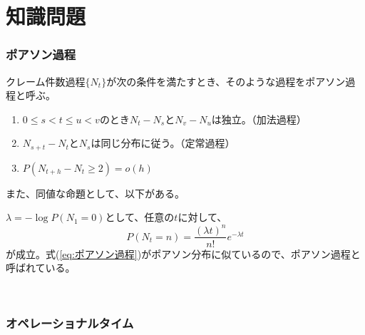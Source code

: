 \section{知識問題}

\subsubsection{ポアソン過程}

\begin{sol}

クレーム件数過程$\{N_t\}$が次の条件を満たすとき、そのような過程をポアソン過程と呼ぶ。

\begin{enumerate}
  \item $0 \leq s < t \leq u < v$のとき$N_t - N_s$と$N_v - N_u$は独立。（加法過程）
  \item $N_{s+t} - N_t$と$N_s$は同じ分布に従う。（定常過程）
  \item $P(N_{t+h} - N_t \geq 2) = o(h) $
\end{enumerate}

また、同値な命題として、以下がある。

$\lambda = - \log P(N_1 = 0)$として、任意の$t$に対して、
\begin{equation}
  P(N_t = n) = \frac{(\lambda t)^n}{n!} e^{-\lambda t}
  \label{eq:ポアソン過程}
\end{equation}
が成立。式(\ref{eq:ポアソン過程})がポアソン分布に似ているので、ポアソン過程と呼ばれている。

\end{sol}

\

\newpage

\subsubsection{オペレーショナルタイム}

